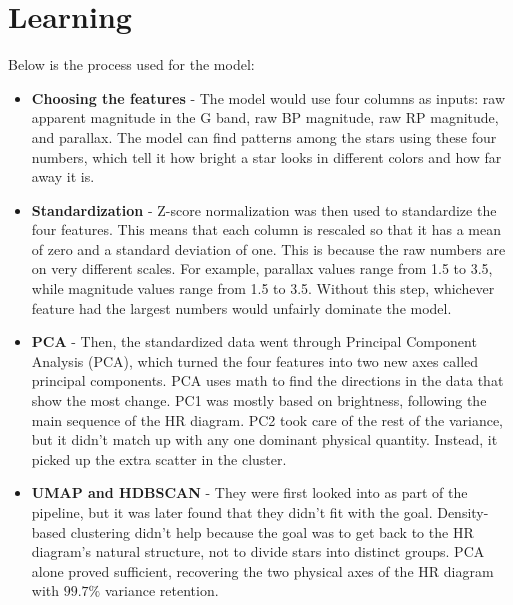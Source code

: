 \documentclass[12pt]{article}
\begin{document}
\section{Learning}
Below is the process used for the model:
\begin{itemize}
    \item \textbf{Choosing the features} - The model would use four columns as inputs: raw apparent magnitude in the G band, raw BP magnitude, raw RP magnitude, and parallax. The model can find patterns among the stars using these four numbers, which tell it how bright a star looks in different colors and how far away it is.
    \item \textbf{Standardization} - Z-score normalization was then used to standardize the four features. This means that each column is rescaled so that it has a mean of zero and a standard deviation of one. This is because the raw numbers are on very different scales. For example, parallax values range from 1.5 to 3.5, while magnitude values range from 1.5 to 3.5. Without this step, whichever feature had the largest numbers would unfairly dominate the model.
    \item \textbf{PCA} - Then, the standardized data went through Principal Component Analysis (PCA), which turned the four features into two new axes called principal components. PCA uses math to find the directions in the data that show the most change. PC1 was mostly based on brightness, following the main sequence of the HR diagram. PC2 took care of the rest of the variance, but it didn't match up with any one dominant physical quantity. Instead, it picked up the extra scatter in the cluster.
    \item \textbf{UMAP and HDBSCAN} - They were first looked into as part of the pipeline, but it was later found that they didn't fit with the goal. Density-based clustering didn't help because the goal was to get back to the HR diagram's natural structure, not to divide stars into distinct groups. PCA alone proved sufficient, recovering the two physical axes of the HR diagram with $99.7\%$ variance retention.
\end{itemize}
\end{document}
